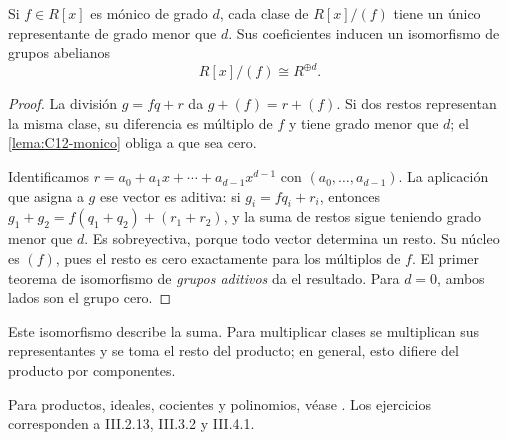 \begin{prop}\label{prop:C12-restos}
Si $f\in R[x]$ es mónico de grado $d$, cada clase de $R[x]/(f)$ tiene un único representante de grado menor que $d$. Sus coeficientes inducen un isomorfismo de grupos abelianos
\[
R[x]/(f)\cong R^{\oplus d}.
\]
\end{prop}
\begin{proof}
La división $g=fq+r$ da $g+(f)=r+(f)$. Si dos restos representan la misma clase, su diferencia es múltiplo de $f$ y tiene grado menor que $d$; el \cref{lema:C12-monico} obliga a que sea cero.

Identificamos $r=a_0+a_1x+\cdots+a_{d-1}x^{d-1}$ con $(a_0,\ldots,a_{d-1})$. La aplicación que asigna a $g$ ese vector es aditiva: si $g_i=fq_i+r_i$, entonces $g_1+g_2=f(q_1+q_2)+(r_1+r_2)$, y la suma de restos sigue teniendo grado menor que $d$. Es sobreyectiva, porque todo vector determina un resto. Su núcleo es $(f)$, pues el resto es cero exactamente para los múltiplos de $f$. El primer teorema de isomorfismo de \emph{grupos aditivos} da el resultado. Para $d=0$, ambos lados son el grupo cero.
\end{proof}
Este isomorfismo describe la suma. Para multiplicar clases se multiplican sus representantes y se toma el resto del producto; en general, esto difiere del producto por componentes.

\begin{obs}
Para productos, ideales, cocientes y polinomios, véase \citet[cap.~III, 2.4--7, 3.1/3/8--11 y 4.1--6]{aluffi2009}. Los ejercicios corresponden a III.2.13, III.3.2 y III.4.1.
\end{obs}
